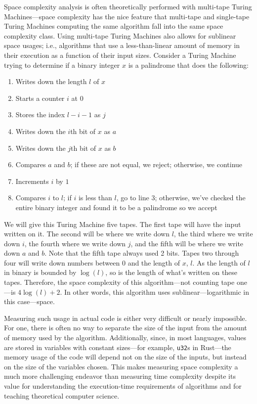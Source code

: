 \documentclass[11pt, a4paper]{article}
\begin{document}
Space complexity analysis is often theoretically performed with multi-tape Turing Machines—space complexity has the nice feature that multi-tape and single-tape Turing Machines computing the same algorithm fall into the same space complexity class.
Using multi-tape Turing Machines also allows for sublinear space usages; i.e., algorithms that use a less-than-linear amount of memory in their execution as a function of their input sizes.
Consider a Turing Machine trying to determine if a binary integer \(x\) is a palindrome that does the following:
\begin{enumerate}
    \item Writes down the length \(l\) of \(x\)
    \item Starts a counter \(i\) at \(0\)
    \item Stores the index \(l-i-1\) as \(j\)
    \item Writes down the \(i\)th bit of \(x\) as \(a\)
    \item Writes down the \(j\)th bit of \(x\) as \(b\)
    \item Compares \(a\) and \(b\); if these are not equal, we reject; otherwise, we continue
    \item Increments \(i\) by \(1\)
    \item Compares \(i\) to \(l\); if \(i\) is less than \(l\), go to line \(3\); otherwise, we've checked the entire binary integer and found it to be a palindrome so we accept
\end{enumerate}
We will give this Turing Machine five tapes.
The first tape will have the input written on it.
The second will be where we write down \(l\), the third where we write down \(i\), the fourth where we write down \(j\), and the fifth will be where we write down \(a\) and \(b\).
Note that the fifth tape always used 2 bits.
Tapes two through four will write down numbers between 0 and the length of \(x\), \(l\).
As the length of \(l\) in binary is bounded by \(\log(l)\), so is the length of what's written on these tapes.
Therefore, the space complexity of this algorithm—not counting tape one—is \(4\log(l) + 2\).
In other words, this algorithm uses sublinear—logarithmic in this case—space.

Measuring such usage in actual code is either very difficult or nearly impossible.
For one, there is often no way to separate the size of the input from the amount of memory used by the algorithm.
Additionally, since, in most languages, values are stored in variables with constant sizes—for example, \lstinline|u32|s in Rust—the memory usage of the code will depend not on the size of the inputs, but instead on the size of the variables chosen.
This makes measuring space complexity a much more challenging endeavor than measuring time complexity despite its value for understanding the execution-time requirements of algorithms and for teaching theoretical computer science.
\end{document}
